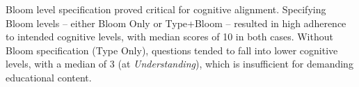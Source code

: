 

Bloom level specification proved critical for cognitive alignment. Specifying Bloom levels -- either Bloom Only or Type+Bloom -- resulted in high adherence to intended cognitive levels, with median scores of 10 in both cases. Without Bloom specification (Type Only), questions tended to fall into lower cognitive levels, with a median of 3 (at \textit{Understanding}), which is insufficient for demanding educational content.

